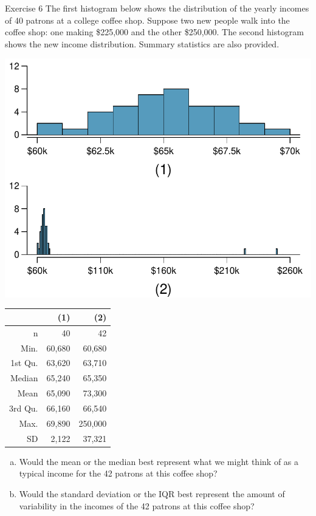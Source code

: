 \documentclass[10pt]{beamer}
\begin{document}
\begin{frame}{Exercise 6}
\small
The first histogram 
below shows the distribution of the yearly incomes of 40 patrons at a college 
coffee shop. Suppose two new people walk into the coffee shop: one making 
\$225,000 and the other \$250,000. The second histogram shows the new income 
distribution. Summary statistics are also provided. \\
\begin{minipage}[c]{0.4\textwidth}
\includegraphics[scale=0.3]{figure/income_coffee_shop.pdf}
\end{minipage}
\begin{minipage}[c]{0.49\textwidth}
\begin{center}
\scriptsize
\begin{tabular}{rrr}
\hline
        & (1)       & (2) \\ 
\hline
n       & 40        & 42 \\ 
Min.    & 60,680    & 60,680 \\ 
1st Qu. & 63,620    & 63,710 \\ 
Median  & 65,240    & 65,350 \\ 
Mean    & 65,090    & 73,300 \\ 
3rd Qu. & 66,160    & 66,540 \\ 
Max.    & 69,890    & 250,000 \\ 
SD      & 2,122     & 37,321 \\ 
\hline
\end{tabular}
\end{center}
\end{minipage}
\begin{enumerate}[(a)]
\item Would the mean or the median best represent what we might think of as a typical income for the 42 patrons at this coffee shop?
\vspace{0.5cm}
\item Would the standard deviation or the IQR best represent the amount of variability in the incomes of the 42 patrons at this coffee shop? 
\vspace{0.5cm}
\end{enumerate}
\end{frame}
\end{document}
